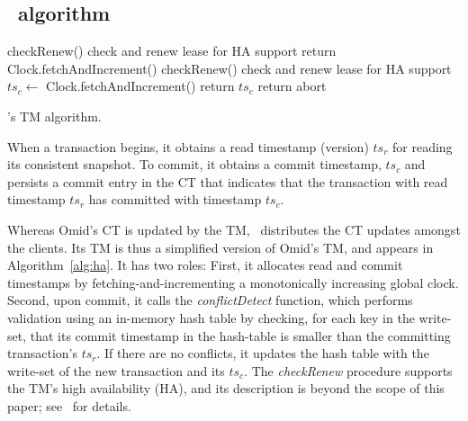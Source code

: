 \subsection{\sysll\ algorithm} 
\label{ssec:ll}

\begin{algorithm}[htb]
\begin{algorithmic}[1]
\small
{}
\State checkRenew() \Comment check and renew lease for HA support
\State return Clock.fetchAndIncrement()
\EndProcedure
{}
\State checkRenew() \Comment check and renew lease for HA support
\State $ts_c \leftarrow$ Clock.fetchAndIncrement()
 \State return $ts_c$
 \Else
 \State return {\sc abort}
\EndIf
\EndProcedure
%
\end{algorithmic}
\caption{\sysll's TM algorithm.}
\label{alg:ha}
\end{algorithm}



When a transaction begins, it obtains a read timestamp (version) $ts_r$ for reading its consistent snapshot.
To commit, it obtains  a commit timestamp, $ts_c$ and persists a commit entry in the CT that indicates that
the transaction with read timestamp $ts_r$ has committed with timestamp $ts_c$. 

Whereas Omid's CT is updated by the TM, \sysll\ distributes the CT updates amongst the clients.
Its TM is thus a simplified version of Omid's TM, and appears  in Algorithm~\ref{alg:ha}. It has two roles:
First, it allocates read and commit timestamps by fetching-and-incrementing a monotonically increasing global clock.
Second, upon commit, it calls the \emph{conflictDetect} function, which 
performs validation  using an in-memory hash table
by checking, for each key in the write-set, that its commit timestamp in the hash-table is smaller than the 
committing transaction's $ts_r$. If there are no conflicts, it 
updates the hash table with the write-set of the new transaction and its $ts_c$. 
The  \emph{checkRenew} procedure supports the TM's  high availability (HA), and its description is beyond the scope of this paper; see~\cite{Omid2017,OmidVLDB} for details. 



